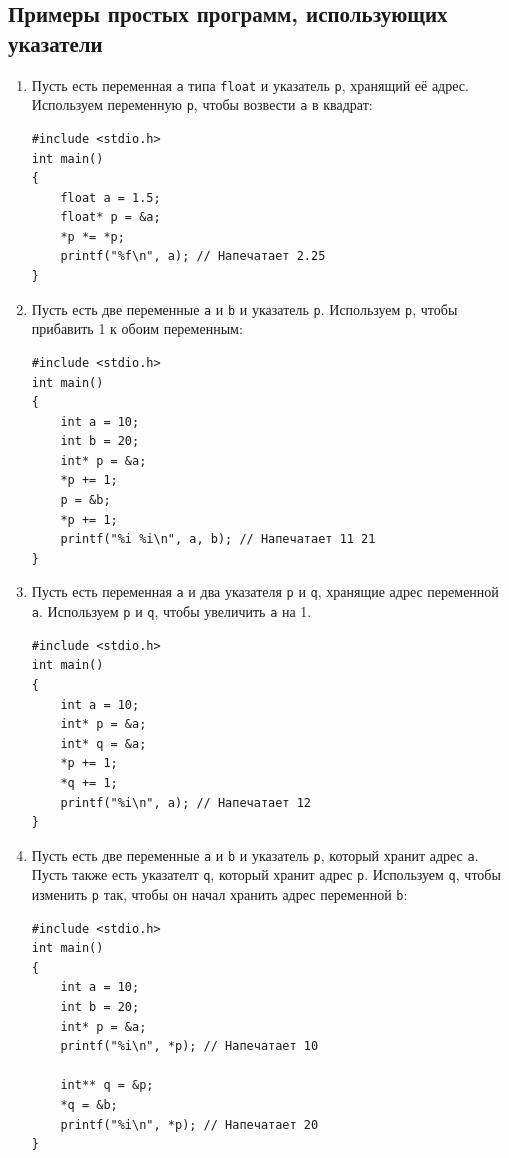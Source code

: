 \documentclass[10pt]{article}
\begin{document}
\subsection*{Примеры простых программ, использующих указатели}
\begin{enumerate}

\item Пусть есть переменная \texttt{a} типа \texttt{float} и указатель \texttt{p}, хранящий её адрес. Используем переменную \texttt{p}, чтобы возвести \texttt{a} в квадрат:
\begin{lstlisting}
#include <stdio.h>
int main() 
{
    float a = 1.5;
    float* p = &a;
    *p *= *p;
    printf("%f\n", a); // Напечатает 2.25
}
\end{lstlisting}

\item Пусть есть две переменные \texttt{a} и \texttt{b} и указатель \texttt{p}. Используем \texttt{p}, чтобы прибавить 1 к обоим переменным:
\begin{lstlisting}
#include <stdio.h>
int main() 
{
    int a = 10;
    int b = 20;
    int* p = &a;
    *p += 1;
    p = &b;
    *p += 1;
    printf("%i %i\n", a, b); // Напечатает 11 21
}
\end{lstlisting}

\item Пусть есть переменная \texttt{a} и два указателя \texttt{p} и \texttt{q}, хранящие адрес переменной \texttt{a}. Используем \texttt{p} и \texttt{q}, чтобы увеличить \texttt{a} на 1. 
\begin{lstlisting}
#include <stdio.h>
int main() 
{
    int a = 10;
    int* p = &a;
    int* q = &a;
    *p += 1;
    *q += 1;
    printf("%i\n", a); // Напечатает 12
}
\end{lstlisting}


\item Пусть есть две переменные \texttt{a} и \texttt{b} и указатель \texttt{p}, который хранит адрес \texttt{a}. Пусть также есть указателт \texttt{q}, который хранит адрес \texttt{p}. Используем \texttt{q}, чтобы изменить \texttt{p} так, чтобы он начал хранить адрес переменной \texttt{b}:
\begin{lstlisting}
#include <stdio.h>
int main() 
{
    int a = 10;
    int b = 20;
    int* p = &a;
    printf("%i\n", *p); // Напечатает 10
    
    int** q = &p;
    *q = &b;
    printf("%i\n", *p); // Напечатает 20
}
\end{lstlisting}
\end{enumerate}
\end{document}
